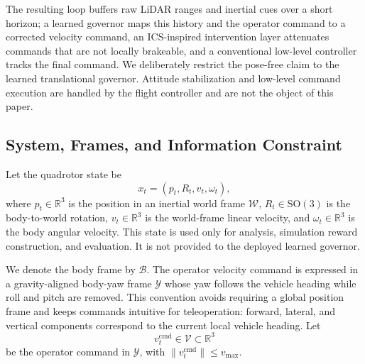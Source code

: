 \documentclass[11pt]{article}
\begin{document}
The resulting loop buffers raw LiDAR ranges and inertial cues over a short
horizon; a learned governor
maps this history and the operator command to a corrected velocity command, an
ICS-inspired intervention layer attenuates commands that are not locally
brakeable, and a conventional low-level controller tracks the final command.
We deliberately restrict the pose-free claim to the learned translational
governor. Attitude stabilization and low-level command execution are handled
by the flight controller and are not the object of this paper.

\subsection{System, Frames, and Information Constraint}
\label{sec:method_system}

Let the quadrotor state be
\begin{equation}
    x_t = (p_t, R_t, v_t, \omega_t),
    \label{eq:state}
\end{equation}
where $p_t \in \mathbb{R}^3$ is the position in an inertial world frame
$\mathcal{W}$, $R_t \in \mathrm{SO}(3)$ is the body-to-world rotation,
$v_t \in \mathbb{R}^3$ is the world-frame linear velocity, and
$\omega_t \in \mathbb{R}^3$ is the body angular velocity. This state is used
only for analysis, simulation reward construction, and evaluation. It is not
provided to the deployed learned governor.

We denote the body frame by $\mathcal{B}$. The operator velocity command is
expressed in a gravity-aligned body-yaw frame $\mathcal{Y}$ whose yaw follows
the vehicle heading while roll and pitch are removed. This convention avoids
requiring a global position frame and keeps commands intuitive for
teleoperation: forward, lateral, and vertical components correspond to the
current local vehicle heading. Let
\begin{equation}
    v^{\mathrm{cmd}}_t \in \mathcal{V} \subset \mathbb{R}^3
    \label{eq:cmd}
\end{equation}
be the operator command in $\mathcal{Y}$, with
$\|v^{\mathrm{cmd}}_t\| \leq v_{\max}$.
\end{document}
